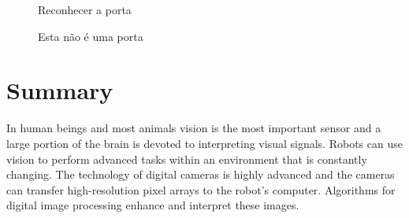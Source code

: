 \begin{figure}
\begin{minipage}{.45\textwidth}
\caption{Reconhecer a porta}\label{fig.door}
\end{minipage}
\hspace{\fill}
\begin{minipage}{.45\textwidth}
\caption{Esta não é uma porta}\label{fig.not-a-door}
\end{minipage}
\end{figure}


\section{Summary}

In human beings and most animals vision is the most important sensor and a large portion of the brain is devoted to interpreting visual signals. Robots can use vision to perform advanced tasks within an environment that is constantly changing. The technology of digital cameras is highly advanced and the cameras can transfer high-resolution pixel arrays to the robot's computer. Algorithms for digital image processing enhance and interpret these images.


